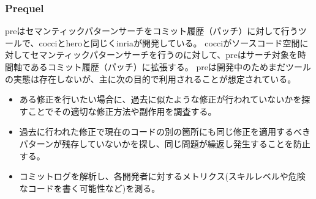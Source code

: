 \subsubsection{Prequel}
\label{presec}
\acrshort{pre}はセマンティックパターンサーチをコミット履歴（パッチ）に対して行うツールで、\acrshort{cocci}と\acrshort{hero}と同じく\acrshort{inria}が開発している。
\acrshort{cocci}がソースコード空間に対してセマンティックパターンサーチを行うのに対して、\acrshort{pre}はサーチ対象を時間軸であるコミット履歴（パッチ）に拡張する。
\acrshort{pre}は開発中のためまだツールの実態は存在しないが、主に次の目的で利用されることが想定されている。
\begin{itemize}
  \item ある修正を行いたい場合に、過去に似たような修正が行われていないかを探すことでその適切な修正方法や副作用を調査する。
  \item 過去に行われた修正で現在のコードの別の箇所にも同じ修正を適用するべきパターンが残存していないかを探し、同じ問題が繰返し発生することを防止する。
  \item コミットログを解析し、各開発者に対するメトリクス(スキルレベルや危険なコードを書く可能性など)を測る。
\end{itemize}
